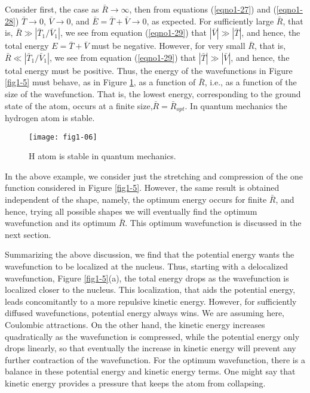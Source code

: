 Consider first, the case as ${\bar R} \rightarrow \infty$, then from
equations (\ref{eqno1-27}) and (\ref{eqno1-28}) ${\bar T} \rightarrow
0$, ${\bar V} \rightarrow 0$, and ${\bar E} = {\bar T} + {\bar V}
\rightarrow 0$, as expected.  For sufficiently large ${\bar R}$, that
is, ${\bar R} \gg | {\bar T}_1 / {\bar V}_1 |$, we see from equation
(\ref{eqno1-29}) that $ | {\bar V} | \gg | {\bar T} |$, and hence, the
total energy $E = {\bar T} + {\bar V}$ must be negative. However, for
very small ${\bar R}$, that is, ${\bar R} \ll | {\bar T}_1 / {\bar
V}_1 |$, we see from equation (\ref{eqno1-29}) that $| {\bar T} | \gg |
{\bar V} |$, and hence, the total energy must be positive. Thus, the
energy of the wavefunctions in Figure \ref{fig1-5} must behave, as in
Figure \ref{fig1-6}, as a function of ${\bar R}$, i.e., as a function
of the size of the wavefunction. That is, the lowest energy,
corresponding to the ground state of the atom, occurs at a finite
size,${\bar R} = {\bar R}_{opt}$.  In quantum mechanics the hydrogen
atom is stable.

\begin{figure}
\begin{center}
\texttt{[image: fig1-06]}
\end{center}
\caption{H atom is stable in quantum mechanics.}
\label{fig1-6}
\end{figure}

In the above example, we consider just the stretching and compression
of the one function considered in Figure \ref{fig1-5}. However, the
same result is obtained independent of the shape, namely, the optimum
energy occurs for finite ${\bar R}$, and hence, trying all possible
shapes we will eventually find the optimum wavefunction and its
optimum ${\bar R}$. This optimum wavefunction is discussed in the next
section.

Summarizing the above discussion, we find that the potential energy wants 
the wavefunction to be localized at the nucleus. Thus, starting with a 
delocalized wavefunction, Figure \ref{fig1-5}(a), the total energy drops as the 
wavefunction is localized closer to the nucleus. This localization, that 
aids the potential energy, leads concomitantly to a more repulsive 
kinetic energy.  However, for sufficiently diffused wavefunctions, potential 
energy always wins. We are assuming here, Coulombic attractions. On the other 
hand, the kinetic energy increases quadratically as the wavefunction is 
compressed, while the potential energy only drops linearly, so that 
eventually the increase in kinetic energy will prevent any further 
contraction of the wavefunction. For the optimum wavefunction, there 
is a balance in these potential energy and kinetic energy terms. One 
might say that kinetic energy provides a pressure that keeps the atom 
from collapsing.

